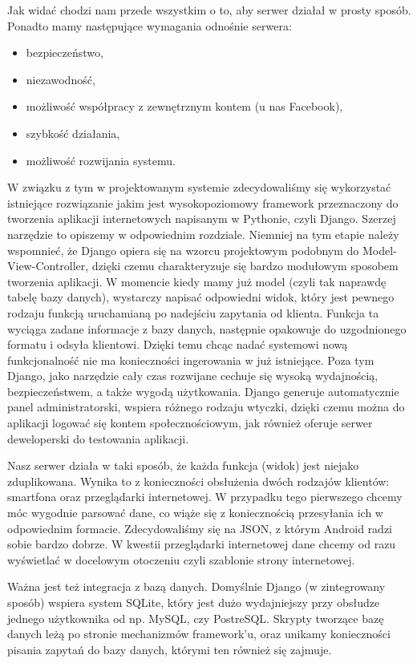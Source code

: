 \documentclass[10pt,titlepage]{article}
\begin{document}
Jak widać chodzi nam przede wszystkim o to, aby serwer działał w prosty sposób. Ponadto mamy następujące wymagania odnośnie serwera:

\begin{itemize}
 \item bezpieczeństwo,
 \item niezawodność,
 \item możliwość współpracy z zewnętrznym kontem (u nas Facebook),
 \item szybkość działania,
 \item możliwość rozwijania systemu.
\end{itemize}

W związku z tym w projektowanym systemie zdecydowaliśmy się wykorzystać istniejące rozwiązanie jakim jest wysokopoziomowy framework przeznaczony do tworzenia aplikacji internetowych napisanym w Pythonie,
czyli Django. Szerzej narzędzie to opiszemy w odpowiednim rozdziale. Niemniej na tym etapie należy wspomnieć, że Django opiera się na wzorcu projektowym podobnym do Model-View-Controller,
dzięki czemu charakteryzuje się bardzo modułowym sposobem tworzenia aplikacji.
W momencie kiedy mamy już model (czyli tak naprawdę tabelę bazy danych), wystarczy napisać odpowiedni widok, który jest pewnego rodzaju funkcją uruchamianą po nadejściu zapytania od klienta.
Funkcja ta wyciąga zadane informacje z bazy danych, następnie opakowuje do uzgodnionego formatu i odsyła klientowi. Dzięki temu chcąc nadać systemowi nową funkcjonalność nie ma konieczności
ingerowania w już istniejące. Poza tym Django, jako narzędzie cały czas rozwijane cechuje się wysoką wydajnością, bezpieczeństwem, a także wygodą użytkowania. Django generuje automatycznie panel
administratorski, wspiera różnego rodzaju wtyczki, dzięki czemu można do aplikacji logować się kontem społecznościowym, jak również oferuje serwer deweloperski do testowania aplikacji.

Nasz serwer działa w taki sposób, że każda funkcja (widok) jest niejako zduplikowana. Wynika to z konieczności obsłużenia dwóch rodzajów klientów: smartfona oraz przeglądarki internetowej.
W przypadku tego pierwszego chcemy móc wygodnie parsować dane, co wiąże się z koniecznością przesyłania ich w odpowiednim formacie. Zdecydowaliśmy się na JSON, z którym Android radzi sobie bardzo dobrze.
W kwestii przeglądarki internetowej dane chcemy od razu wyświetlać w docelowym otoczeniu czyli szablonie strony internetowej.

Ważna jest też integracja z bazą danych. Domyślnie Django (w zintegrowany sposób) wspiera system SQLite, który jest dużo wydajniejszy przy obsłudze jednego użytkownika od np. MySQL, czy PostreSQL.
Skrypty tworzące bazę danych leżą po stronie mechanizmów framework'u, oraz unikamy konieczności pisania zapytań do bazy danych, którymi ten również się zajmuje.
\end{document}
